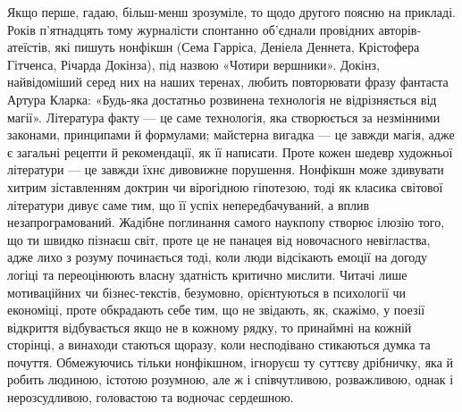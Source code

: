 Якщо перше, гадаю, більш-менш зрозуміле, то щодо другого поясню на прикладі.
Років п’ятнадцять тому журналісти спонтанно об’єднали провідних
авторів-атеїстів, які пишуть нонфікшн (Сема Гарріса, Деніела Деннета,
Крістофера Гітченса, Річарда Докінза), під назвою «Чотири вершники». Докінз,
найвідоміший серед них на наших теренах, любить повторювати фразу фантаста
Артура Кларка: «Будь-яка достатньо розвинена технологія не відрізняється від
магії». Література факту — це саме технологія, яка створюється за незмінними
законами, принципами й формулами; майстерна вигадка — це завжди магія, адже є
загальні рецепти й рекомендації, як її написати. Проте кожен шедевр художньої
літератури — це завжди їхнє дивовижне порушення. Нонфікшн може здивувати хитрим
зіставленням доктрин чи вірогідною гіпотезою, тоді як класика світової
літератури дивує саме тим, що її успіх непередбачуваний, а вплив
незапрограмований. Жадібне поглинання самого наукпопу створює ілюзію того, що
ти швидко пізнаєш світ, проте це не панацея від новочасного невігластва, адже
лихо з розуму починається тоді, коли люди відсікають емоції на догоду логіці та
переоцінюють власну здатність критично мислити. Читачі лише мотиваційних чи
бізнес-текстів, безумовно, орієнтуються в психології чи економіці, проте
обкрадають себе тим, що не звідають, як, скажімо, у поезії відкриття
відбувається якщо не в кожному рядку, то принаймні на кожній сторінці, а
винаходи стаються щоразу, коли несподівано стикаються думка та почуття.
Обмежуючись тільки нонфікшном, ігноруєш ту суттєву дрібничку, яка й робить
людиною, істотою розумною, але ж і співчутливою, розважливою, однак і
нерозсудливою, головастою та водночас сердешною. 
